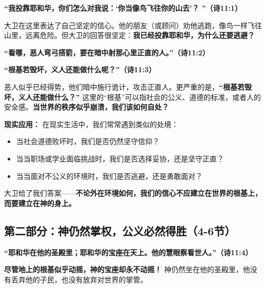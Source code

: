 \documentclass[a4paper, 12pt]{article}
\begin{document}
\hspace{0.4cm}\textbf{“我投靠耶和华，你们怎么对我说：‘你当像鸟飞往你的山去’？ {} ”（诗11:1）  
}

\vspace{0.2cm}

大卫在这里表达了自己坚定的信心。他的朋友（或顾问）劝他逃跑，像鸟一样飞往山里，远离危险。但大卫的回答很坚定：\textbf{我已经投靠耶和华，为什么还要逃避？}

\vspace{0.2cm}

\textbf{“看哪，恶人弯弓搭箭，要在暗中射那心里正直的人。”（诗11:2）}

\textbf{“根基若毁坏，义人还能做什么呢？”（诗11:3） } 

\vspace{0.2cm}

恶人似乎已经得势，他们暗中施行诡计，攻击正直人。更严重的是，\textbf{“根基若毁坏，义人还能做什么？” }这里的“根基”可以指社会的公义、道德的标准，或者人的安全感。\textbf{当世界的秩序似乎崩溃，我们该如何自处？}

 
\vspace{0.2cm}

\textbf{现实应用： } 
在现实生活中，我们常常遇到类似的处境：  

\begin{itemize}
     \item 当社会道德败坏时，我们是否仍然坚守信仰？  
     \item 当当职场或学业面临挑战时，我们是否选择妥协，还是坚守正直？  
     \item 当当面对不公义的环境时，我们是否逃避，还是勇敢面对？
\end{itemize}

大卫给了我们答案——\textbf{不论外在环境如何，我们的信心不应建立在世界的根基上，而要建立在神的身上。}  


\subsection*{第二部分：神仍然掌权，公义必然得胜（4-6节）}

\hspace{0.4cm} \textbf{“耶和华在他的圣殿里；耶和华的宝座在天上。他的慧眼察看世人。”（诗11:4）  }

\vspace{0.2cm}

\textbf{尽管地上的根基似乎动摇，神的宝座却永不动摇！} 神仍然坐在他的圣殿里，他没有丢弃他的子民，也没有放弃对世界的掌管。  
\end{document}
